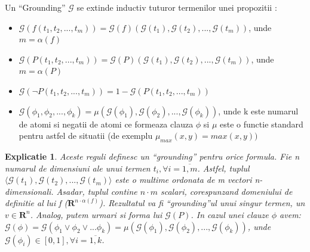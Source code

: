 \documentclass{article}
\newtheorem{explanado}{Explicatie}[section]
\begin{document}
Un ``Grounding'' $\mathcal{G}$ se extinde inductiv tuturor termenilor unei propozitii \cite{LTN}:\\
\begin{itemize}
	\item $\mathcal{G}(f(t_1, t_2, ..., t_m)) = \mathcal{G}(f)(\mathcal{G}(t_1), \mathcal{G}(t_2), ..., \mathcal{G}(t_m))$, unde $m = \alpha(f)$
	\item $\mathcal{G}(P(t_1, t_2, ..., t_m)) = \mathcal{G}(P)(\mathcal{G}(t_1), \mathcal{G}(t_2), ..., \mathcal{G}(t_m))$, unde $m =\alpha(P)$
	\item $\mathcal{G}(\neg P(t_1, t_2, ..., t_m)) = 1 - \mathcal{G}(P(t_1, t_2, ..., t_m))$
	\item $\mathcal{G}(\phi_1, \phi_2, ..., \phi_k) = \mu(\mathcal{G}(\phi_1), \mathcal{G}(\phi_2), ..., \mathcal{G}(\phi_k))$, unde k este numarul de atomi si negatii de atomi ce formeaza clauza $\phi$ si $\mu$ este o functie standard pentru astfel de situatii (de exemplu $\mu_{max}(x, y) = max(x, y))$
\end{itemize}

\begin{explanado}
Aceste reguli definesc un ``grounding'' pentru orice formula. Fie n numarul de dimensiuni ale unui termen $t_i, \forall i = \overline{1,  m}$. Astfel, tuplul $ \langle \mathcal{G}(t_1), \mathcal{G}(t_2), ..., \mathcal{G}(t_m) \rangle$ este o multime ordonata de m vectori n-dimensionali. Asadar, tuplul contine $n \cdot m$ scalari, corespunzand domeniului de definitie al lui f ($\mathbf{R}^{n \cdot \alpha(f)}$). Rezultatul va fi ``grounding''ul unui singur termen, un $v \in \mathbf{R}^n$. Analog, putem urmari si forma lui $\mathcal{G}(P)$. In cazul unei clauze $\phi$ avem: $\mathcal{G}(\phi) = \mathcal{G}(\phi_1 \vee \phi_2 \vee ... \phi_k) = \mu(\mathcal{G}(\phi_1), \mathcal{G}(\phi_2), ..., \mathcal{G}(\phi_k))$, unde $\mathcal{G}(\phi_i) \in [0, 1], \forall i = \overline{1, k}$. \cite{LTN} 
\end{explanado}
\end{document}
